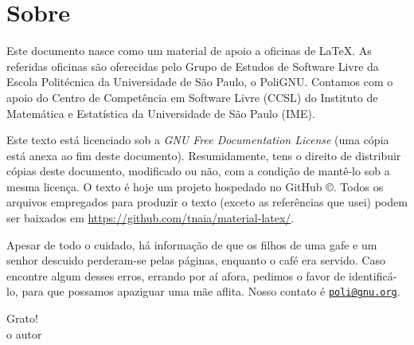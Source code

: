 \section*{Sobre}

Este documento nasce como um material de apoio a oficinas de
\LaTeX. As referidas oficinas são oferecidas pelo Grupo de Estudos de
Software Livre da Escola Politécnica da Universidade de São Paulo, o
PoliGNU. Contamos com o apoio do Centro de Competência em Software Livre (CCSL) do Instituto de Matemática e Estatística da Universidade de São Paulo (IME).

Este texto está licenciado sob a \emph{GNU Free
Documentation License} (uma cópia está anexa ao fim deste documento).
Resumidamente, tens o direito de distribuir cópias deste documento,
modificado ou não, com a condição de mantê-lo sob a mesma licença.
O texto é hoje um projeto hospedado no GitHub \copyright. Todos os
arquivos empregados para produzir o texto (exceto as referências que
usei) podem ser baixados em
\url{https://github.com/tnaia/material-latex/}.

\vspace*{\fill}

Apesar de todo o cuidado, há informação de que os filhos de uma gafe e
um senhor descuido perderam-se pelas páginas, enquanto o café era
servido. Caso encontre algum desses erros, errando por aí afora,
pedimos o favor de identificá-lo, para que possamos apaziguar uma mãe
aflita. 
Nosso contato é \href{mailto:poli@gnu.org}{\nolinkurl{poli@gnu.org}}.


\begin{flushright}
Grato!\\
o autor
\end{flushright}
\vspace*{\fill}
\clearpage
